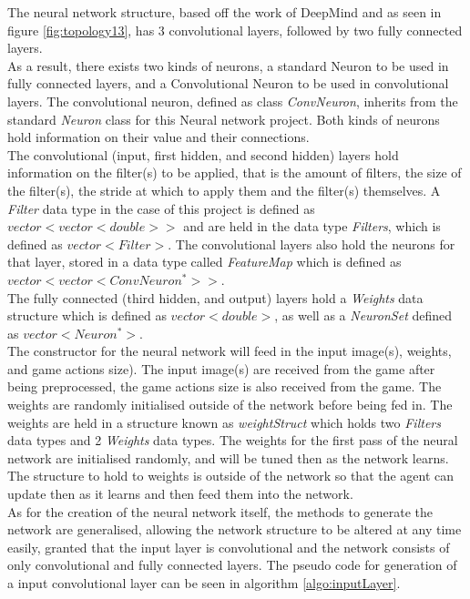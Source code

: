 \documentclass[10pt]{article}
\begin{document}
	The neural network structure, based off the work of DeepMind and as seen in figure \ref{fig:topology13}, has 3 convolutional layers, followed by two fully connected layers.\\ 
	
	As a result, there exists two kinds of neurons, a standard Neuron to be used in fully connected layers, and a Convolutional Neuron to be used in convolutional layers. The convolutional neuron, defined as class \textit{ConvNeuron}, inherits from the standard \textit{Neuron} class for this Neural network project. Both kinds of neurons hold information on their value and their connections.\\
	
	The convolutional (input, first hidden, and second hidden) layers hold information on the filter(s) to be applied, that is the amount of filters, the size of the filter(s), the stride at which to apply them and the filter(s) themselves. A \textit{Filter} data type in the case of this project is defined as $vector<vector<double>>$ and are held in the data type \textit{Filters}, which is defined as $vector<Filter>$. The convolutional layers also hold the neurons for that layer, stored in a data type called \textit{FeatureMap} which is defined as $vector<vector<ConvNeuron^*>>$.\\
	
	The fully connected (third hidden, and output) layers hold a \textit{Weights} data structure which is defined as $vector<double>$, as well as a \textit{NeuronSet} defined as $vector<Neuron^*>$.\\
	
	The constructor for the neural network will feed in the input image(s), weights, and game actions size). The input image(s) are received from the game after being preprocessed, the game actions size is also received from the game. The weights are randomly initialised outside of the network before being fed in. The weights are held in a structure known as \textit{weightStruct} which holds two \textit{Filters} data types and 2 \textit{Weights} data types. The weights for the first pass of the neural network are initialised randomly, and will be tuned then as the network learns. The structure to hold to weights is outside of the network so that the agent can update then as it learns and then feed them into the network.\\
	
	As for the creation of the neural network itself, the methods to generate the network are generalised, allowing the network structure to be altered at any time easily, granted that the input layer is convolutional and the network consists of only convolutional and fully connected layers. The pseudo code for generation of a input convolutional layer can be seen in algorithm \ref{algo:inputLayer}.\\
		
\end{document}
